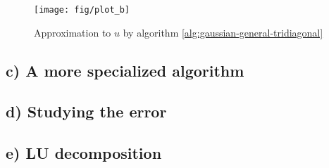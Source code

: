 \documentclass[a4paper]{article}
\begin{document}
\begin{figure}[ht]
\texttt{[image: fig/plot\_b]}
\caption{Approximation to $u$ by algorithm \ref{alg:gaussian-general-tridiagonal}}
\end{figure}


\subsection*{c) A more specialized algorithm}

\subsection*{d) Studying the error}

\subsection*{e) LU decomposition}


\end{document}

